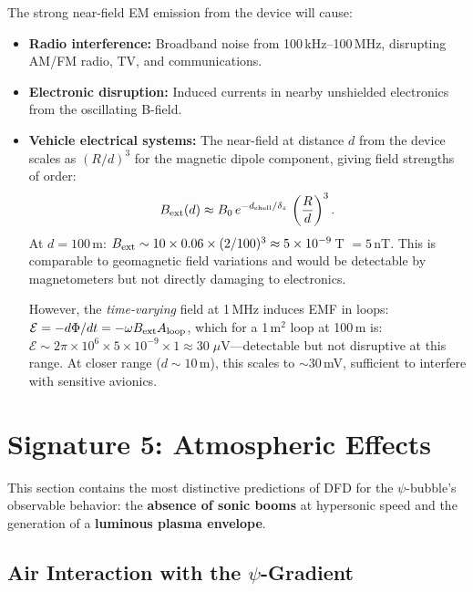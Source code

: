 \documentclass[11pt]{article}
\begin{document}
The strong near-field EM emission from the device will cause:
\begin{itemize}[noitemsep]
\item \textbf{Radio interference:} Broadband noise from 100\,kHz--100\,MHz,
  disrupting AM/FM radio, TV, and communications.
\item \textbf{Electronic disruption:} Induced currents in nearby unshielded
  electronics from the oscillating B-field.
\item \textbf{Vehicle electrical systems:} The near-field at distance $d$
  from the device scales as $(R/d)^3$ for the magnetic dipole component,
  giving field strengths of order:
  \begin{equation}
  B_{\rm ext}(d) \approx B_0\,e^{-d_{\rm shell}/\delta_s}\,\left(\frac{R}{d}\right)^3.
  \end{equation}
  At $d = 100$\,m: $B_{\rm ext} \sim 10 \times 0.06 \times (2/100)^3
  \approx 5 \times 10^{-9}$\,T $= 5$\,nT. This is comparable to
  geomagnetic field variations and would be detectable by magnetometers
  but not directly damaging to electronics.

  However, the \emph{time-varying} field at 1\,MHz induces EMF in loops:
  $\mathcal{E} = -d\Phi/dt = -\omega B_{\rm ext} A_{\rm loop}$, which
  for a 1\,m$^2$ loop at 100\,m is:
  $\mathcal{E} \sim 2\pi \times 10^6 \times 5 \times 10^{-9} \times 1
  \approx 30\;\mu$V---detectable but not disruptive at this range.
  At closer range ($d \sim 10$\,m), this scales to $\sim 30$\,mV,
  sufficient to interfere with sensitive avionics.
\end{itemize}


\section{Signature 5: Atmospheric Effects}\label{sec:atmosphere}

This section contains the most distinctive predictions of DFD for the
$\psi$-bubble's observable behavior: the \textbf{absence of sonic booms}
at hypersonic speed and the generation of a \textbf{luminous plasma
envelope}.

\subsection{Air Interaction with the $\psi$-Gradient}
\end{document}
